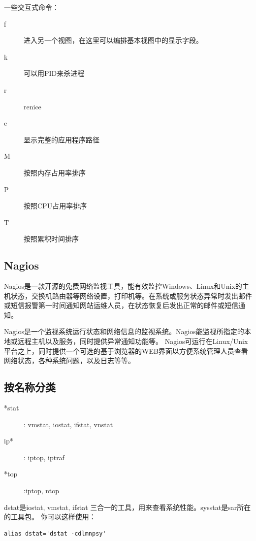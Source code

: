 一些交互式命令：
\begin{description}
    \item  [f] 进入另一个视图，在这里可以编排基本视图中的显示字段。
    \item  [k] 可以用PID来杀进程
    \item  [r] renice
    \item  [c] 显示完整的应用程序路径
    \item  [M] 按照内存占用率排序
    \item  [P] 按照CPU占用率排序
    \item  [T] 按照累积时间排序    
\end{description}



\subsection{Nagios}
Nagios是一款开源的免费网络监视工具，能有效监控Windows、Linux和Unix的主机状态，交换机路由器等网络设置，打印机等。在系统或服务状态异常时发出邮件或短信报警第一时间通知网站运维人员，在状态恢复后发出正常的邮件或短信通知。

Nagios是一个监视系统运行状态和网络信息的监视系统。Nagios能监视所指定的本地或远程主机以及服务，同时提供异常通知功能等。
Nagios可运行在Linux/Unix平台之上，同时提供一个可选的基于浏览器的WEB界面以方便系统管理人员查看网络状态，各种系统问题，以及日志等等。

\subsection{按名称分类}
\begin{description}
\item[*stat]: vmstat, iostat, ifstat, vnstat
\item[ip*]: iptop, iptraf
\item[*top]:iptop, ntop
\end{description}

dstat是iostat, vmstat, ifstat 三合一的工具，用来查看系统性能。sysstat是sar所在的工具包。
你可以这样使用：
\begin{verbatim}
alias dstat='dstat -cdlmnpsy'
\end{verbatim}













